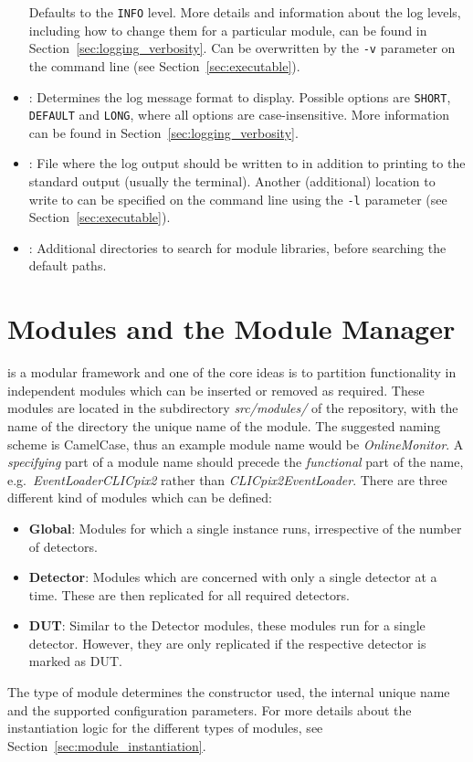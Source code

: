 \begin{itemize}
Defaults to the \texttt{INFO} level.
More details and information about the log levels, including how to change them for a particular module, can be found in Section~\ref{sec:logging_verbosity}.
Can be overwritten by the \texttt{-v} parameter on the command line (see Section~\ref{sec:executable}).
\item {}: Determines the log message format to display.
Possible options are \texttt{SHORT}, \texttt{DEFAULT} and \texttt{LONG}, where all options are case-insensitive.
More information can be found in Section~\ref{sec:logging_verbosity}.
\item {}: File where the log output should be written to in addition to printing to the standard output (usually the terminal).
Another (additional) location to write to can be specified on the command line using the \texttt{-l} parameter (see Section~\ref{sec:executable}).
\item {}: Additional directories to search for module libraries, before searching the default paths.
\end{itemize}

\section{Modules and the Module Manager}
\label{sec:module_manager}
\corry is a modular framework and one of the core ideas is to partition functionality in independent modules which can be inserted or removed as required.
These modules are located in the subdirectory \textit{src/modules/} of the repository, with the name of the directory the unique name of the module.
The suggested naming scheme is CamelCase, thus an example module name would be \textit{OnlineMonitor}.
A \emph{specifying} part of a module name should precede the \emph{functional} part of the name, e.g.\ \textit{EventLoaderCLICpix2} rather than \textit{CLICpix2EventLoader}.
There are three different kind of modules which can be defined:
\begin{itemize}
    \item \textbf{Global}: Modules for which a single instance runs, irrespective of the number of detectors.
    \item \textbf{Detector}: Modules which are concerned with only a single detector at a time.
    These are then replicated for all required detectors.
    \item \textbf{DUT}: Similar to the Detector modules, these modules run for a single detector.
    However, they are only replicated if the respective detector is marked as DUT.
\end{itemize}
The type of module determines the constructor used, the internal unique name and the supported configuration parameters.
For more details about the instantiation logic for the different types of modules, see Section~\ref{sec:module_instantiation}.

